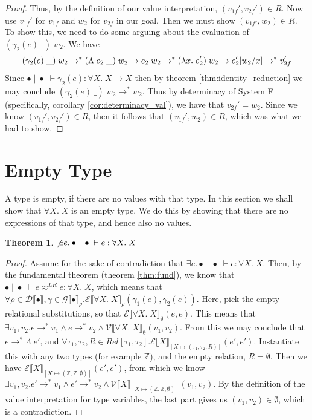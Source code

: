 \documentclass[a4paper, 11pt]{report}
\newtheorem{theorem}{Theorem}
\theoremstyle{definition}
\newcommand{\var}{x}
\newcommand{\expr}{e}
\newcommand{\val}{v}
\newcommand{\valB}{w}
\newcommand{\Tvar}{X}
\newcommand{\Tlam}{\Lambda\;}
\newcommand{\Tapp}[1]{#1\;\_}
\newcommand{\subst}[3]{#1{\left[#3 \middle/ #2 \right]}}
\newcommand{\Tint}{\mathbb{Z}}
\newcommand{\Tfunc}[2]{#1 \rightarrow #2}
\newcommand{\Tall}[2]{\forall #1.\; #2}
\newcommand{\typ}{\tau}
\newcommand{\emptenv}{\bullet}
\newcommand{\empvenv}{\bullet}
\newcommand{\jdg}[4]{#1 \; | \; #2 \; \vdash #3 : #4}
\newcommand{\jdgRel}[6]{#1 \; | \; #2 \; \vdash #3 \approx^{#4} #5 : #6}
\newcommand{\step}{\rightarrow}
\newcommand{\stepS}{\rightarrow^*}
\newcommand{\ValInp}[2]{\mathcal{V} \llbracket #1 \rrbracket_{#2}}
\newcommand{\ValInpGen}[2]{\ValInp{#1}{#2}(\val_1, \val_2)}
\newcommand{\ExpInp}[2]{\mathcal{E} \llbracket #1 \rrbracket_{#2}}
\newcommand{\VenvInp}[2]{\mathcal{G} \llbracket #1 \rrbracket_{#2}}
\newcommand{\TenvInp}[1]{\mathcal{D} \llbracket #1 \rrbracket}
\newcommand{\LogRel}[5]{\jdgRel{#1}{#2}{#3}{LR}{#4}{#5}}
\newcommand{\map}[2]{#1 \mapsto #2}
\begin{document}
\begin{proof}
  Thus, by the definition of our value interpretation, $(\val_{1f}', \val_{2f}') \in R$. Now use $\val_{1f}'$ for $\val_{1f}$ and $\valB_2$ for $\val_{2f}$ in our goal. Then we must show $(\val_{1f'}, \valB_2) \in R$. To show this, we need to do some arguing about the evaluation of $(\Tapp{\gamma_2(\expr)}) \; \valB_2$. We have 
  \begin{equation*}
    (\Tapp{\gamma_2(\expr)}) \; \valB_2 \stepS (\Tapp{\Tlam \expr_2}) \; \valB_2 \step \expr_2 \; \valB_2 \stepS (\fun \var . \expr_2') \; \valB_2 \step \subst{\expr_2'}{\var}{\valB_2} \stepS \val_{2f}'
  \end{equation*}
  Since $\jdg{\emptenv}{\empvenv}{\gamma_2(\expr)}{\Tall{\Tvar}{\Tfunc{\Tvar}{\Tvar}}}$ then by theorem \ref{thm:identity_reduction} we may conclude $(\Tapp{\gamma_2(\expr)}) \; \valB_2 \stepS \valB_2$. Thus by determinacy of System F (specifically, corollary \ref{cor:determinacy_val}), we have that $\val_{2f}' = \valB_2$. Since we know $(\val_{1f}', \val_{2f}') \in R$, then it follows that $(\val_{1f}', \valB_2) \in R$, which was what we had to show.
\end{proof}


\section{Empty Type}
A type is empty, if there are no values with that type. In this section we shall show that $\Tall{\Tvar}{\Tvar}$ is an empty type. We do this by showing that there are no expressions of that type, and hence also no values.
\begin{theorem}
  $\not\exists \expr . \jdg{\emptenv}{\empvenv}{\expr}{\Tall{\Tvar}{\Tvar}}$
\end{theorem}
\begin{proof}
  Assume for the sake of contradiction that $\exists \expr . \jdg{\emptenv}{\empvenv}{\expr}{\Tall{\Tvar}{\Tvar}}$. Then, by the fundamental theorem (theorem \ref{thm:fund}), we know that $\LogRel{\emptenv}{\empvenv}{\expr}{\expr}{\Tall{\Tvar}{\Tvar}}$, which means that $\forall \rho \in \TenvInp{\emptenv}, \gamma \in \VenvInp{\empvenv}{\rho} . 
  \ExpInp{\Tall{\Tvar}{\Tvar}}{\rho}(\gamma_1(\expr), \gamma_2(\expr))$. Here, pick the empty relational substitutions, so that $\ExpInp{\Tall{\Tvar}{\Tvar}}{\emptyset}(\expr, \expr)$. This means that $\exists \val_1, \val_2 . \expr \stepS \val_1 \land \expr \stepS \val_2 \land \ValInpGen{\Tall{\Tvar}{\Tvar}}{\emptyset}$. From this we may conclude that $\expr \stepS \Tlam \expr'$, and $\forall \typ_1, \typ_2, R \in Rel[\typ_1, \typ_2] . \ExpInp{\Tvar}{[\map{\Tvar}{(\typ_1, \typ_2, R)}]}(\expr', \expr')$. Instantiate this with any two types (for example $\Tint$), and the empty relation, $R = \emptyset$. Then we have $\ExpInp{\Tvar}{[\map{\Tvar}{(\Tint, \Tint, \emptyset)}]}(\expr', \expr')$, from which we know $\exists \val_1, \val_2 . \expr' \stepS \val_1 \land \expr' \stepS \val_2 \land \ValInpGen{\Tvar}{[\map{\Tvar}{(\Tint, \Tint, \emptyset)}]}$. By the definition of the value interpretation for type variables, the last part gives us $(\val_1, \val_2) \in \emptyset$, which is a contradiction.
\end{proof}
\end{document}
